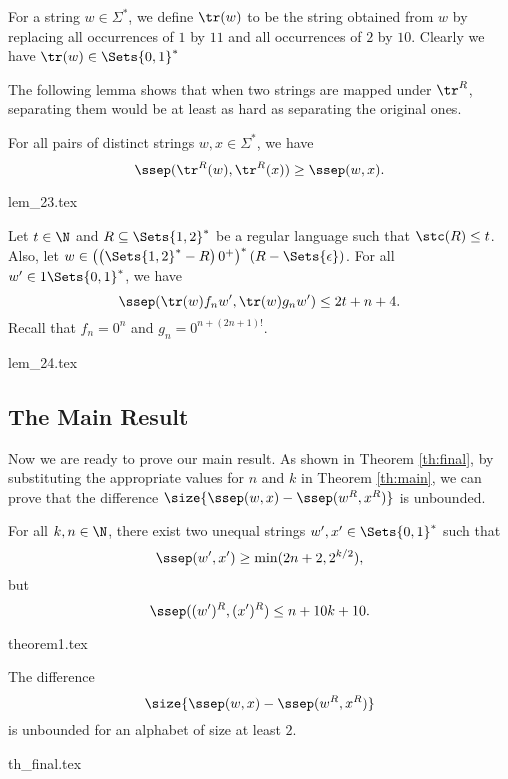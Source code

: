 \documentclass[preprint, 12pt]{elsarticle}
\begin{document}
	\begin{definition}
		For a string $w \in \Sigma^*$, we define $\tr(w)$ to be the string obtained from $w$ by replacing all occurrences of $1$ by $11$ and all occurrences of $2$ by $10$. Clearly we have $\tr(w) \in \Sets{0,1}^*$		
	\end{definition}
	
	The following lemma shows that when two strings are mapped under $\tr^R$, separating them would be at least as hard as separating the original ones.
	\begin{lemma}
		\label{lem:23}
		For all pairs of distinct strings $w,x \in \Sigma^*$, we have 
		$$\ssep(\tr^R(w), \tr^R(x)) \geq \ssep(w, x).$$
	\end{lemma}
	{lem_23.tex}
	
	\begin{lemma}
		\label{lem:24}
		Let $t \in \N$ and $R \subseteq \Sets{1,2}^*$ be a regular language such that $\stc(R) \leq t$.
		Also, let $w \in \left(\left(\Sets{1,2}^* - R \right) 0^+ \right)^* (R - \Sets{\epsilon})$.
		For all $w' \in 1\Sets{0,1}^*$, we have
		$$\ssep(\tr(w) f_n w', \tr(w) g_n w') \leq 2t + n + 4.$$
		Recall that $f_n = 0^n$ and  $g_n = 0^{n+(2n+1)!}$.
	\end{lemma}
	{lem_24.tex}
	
	\subsection{The Main Result}
	\label{subsec:five}
	Now we are ready to prove our main result. As shown in Theorem \ref{th:final}, by substituting the appropriate values for $n$ and $k$ in Theorem \ref{th:main}, we can prove that the difference $\size{\ssep(w,x)-\ssep(w^R,x^R)}$ is unbounded.
	
	
	\begin{theorem}
		\label{th:main}
		For all $k, n \in \N$, there exist two unequal strings $w', x' \in \Sets{0,1}^*$ such that 
		$$\ssep(w', x') \geq \min(2n + 2, 2^{k/2}),$$
		but 
		$$\ssep((w')^R, (x')^R) \leq n + 10k + 10.$$ 
	\end{theorem}
	{theorem1.tex}
	
	
	
	\begin{theorem}
		\label{th:final}
		The difference 
		$$\size{\ssep(w,x)-\ssep(w^R,x^R)}$$ is unbounded for an alphabet of size at least $2$. 
	\end{theorem}
	{th_final.tex}
\end{document}
